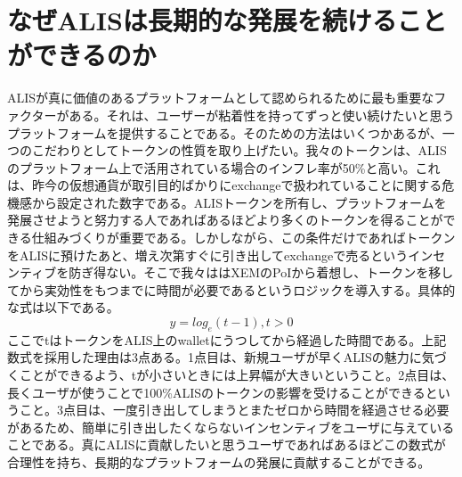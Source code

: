 \documentclass{jsarticle}
\begin{document}
\section{なぜALISは長期的な発展を続けることができるのか}
ALISが真に価値のあるプラットフォームとして認められるために最も重要なファクターがある。それは、ユーザーが粘着性を持ってずっと使い続けたいと思うプラットフォームを提供することである。そのための方法はいくつかあるが、一つのこだわりとしてトークンの性質を取り上げたい。我々のトークンは、ALISのプラットフォーム上で活用されている場合のインフレ率が50\%と高い。これは、昨今の仮想通貨が取引目的ばかりにexchangeで扱われていることに関する危機感から設定された数字である。ALISトークンを所有し、プラットフォームを発展させようと努力する人であればあるほどより多くのトークンを得ることができる仕組みづくりが重要である。しかしながら、この条件だけであればトークンをALISに預けたあと、増え次第すぐに引き出してexchangeで売るというインセンティブを防ぎ得ない。そこで我々ははXEMのPoIから着想し、トークンを移してから実効性をもつまでに時間が必要であるというロジックを導入する。具体的な式は以下である。
\begin{equation}
y = log_e(t-1) , t > 0
\end{equation}
ここでtはトークンをALIS上のwalletにうつしてから経過した時間である。上記数式を採用した理由は3点ある。1点目は、新規ユーザが早くALISの魅力に気づくことができるよう、tが小さいときには上昇幅が大きいということ。2点目は、長くユーザが使うことで100\%ALISのトークンの影響を受けることができるということ。3点目は、一度引き出してしまうとまたゼロから時間を経過させる必要があるため、簡単に引き出したくならないインセンティブをユーザに与えていることである。真にALISに貢献したいと思うユーザであればあるほどこの数式が合理性を持ち、長期的なプラットフォームの発展に貢献することができる。
\end{document}
